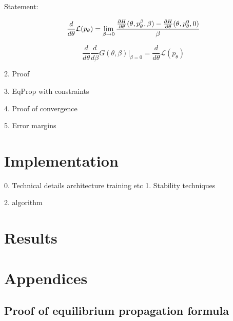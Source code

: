 \documentclass[a4paper,10pt]{report}
\begin{document}
Statement:

\begin{equation}
 \frac{d}{d\theta} \mathcal{L}(p_\theta) = \lim_{\beta \to 0} \frac{\frac{\partial H}{\partial \theta}(\theta, p_\theta^\beta, \beta)-\frac{\partial H}{\partial \theta}(\theta, p_\theta^0, 0) }{\beta}
\end{equation}



\begin{equation}
 \frac{d}{d\theta}\frac{d}{d\beta}G(\theta,\beta)\big|_{\beta=0} = \frac{d}{d\theta} \mathcal{L}(p_\theta)
\end{equation}






2. Proof

3. EqProp with constraints



4. Proof of convergence

5. Error margins
\section{ Implementation}
0. Technical details
    architecture
    training
    etc
1. Stability techniques

2. algorithm
\section{Results}


\nocite{*}





\section{Appendices}
\subsection{Proof of equilibrium propagation formula}
\end{document}
